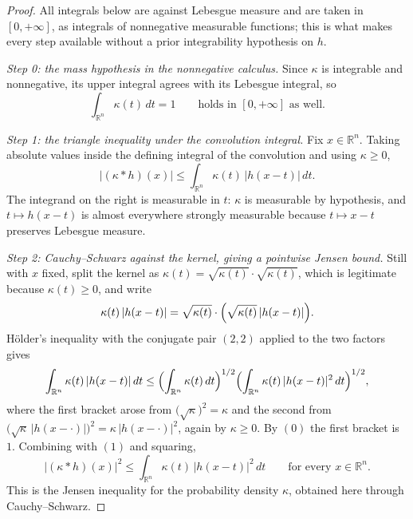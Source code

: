 \begin{proof}
All integrals below are against Lebesgue measure and are taken in $[0,+\infty]$,
as integrals of nonnegative measurable functions; this is what makes every step
available without a prior integrability hypothesis on $h$.

\emph{Step 0: the mass hypothesis in the nonnegative calculus.}  Since $\kappa$ is
integrable and nonnegative, its upper integral agrees with its Lebesgue integral,
so
\begin{equation*}
  \int_{\mathbb{R}^n} \kappa(t)\, dt = 1
  \qquad\text{holds in } [0,+\infty] \text{ as well.} \tag{0}
\end{equation*}

\emph{Step 1: the triangle inequality under the convolution integral.}
Fix $x \in \mathbb{R}^n$.  Taking absolute values inside the defining integral of
the convolution and using $\kappa \geq 0$,
\begin{equation*}
  |(\kappa*h)(x)|
    \leq \int_{\mathbb{R}^n} \kappa(t)\, |h(x-t)| \, dt . \tag{1}
\end{equation*}
The integrand on the right is measurable in $t$: $\kappa$ is measurable by
hypothesis, and $t \mapsto h(x-t)$ is almost everywhere strongly measurable
because $t \mapsto x - t$ preserves Lebesgue measure.

\emph{Step 2: Cauchy--Schwarz against the kernel, giving a pointwise Jensen bound.}
Still with $x$ fixed, split the kernel as
$\kappa(t) = \sqrt{\kappa(t)} \cdot \sqrt{\kappa(t)}$, which is legitimate because
$\kappa(t) \geq 0$, and write
\[
  \kappa(t)\,|h(x-t)|
    = \sqrt{\kappa(t)} \cdot \Bigl(\sqrt{\kappa(t)}\, |h(x-t)|\Bigr) .
\]
H\"older's inequality with the conjugate pair $(2,2)$ applied to the two factors
gives
\[
  \int_{\mathbb{R}^n} \kappa(t)\,|h(x-t)| \, dt
    \leq \Bigl(\int_{\mathbb{R}^n} \kappa(t) \, dt\Bigr)^{1/2}
        \Bigl(\int_{\mathbb{R}^n} \kappa(t)\,|h(x-t)|^2 \, dt\Bigr)^{1/2} ,
\]
where the first bracket arose from $\bigl(\sqrt{\kappa}\bigr)^2 = \kappa$ and the
second from $\bigl(\sqrt{\kappa}\,|h(x-\cdot)|\bigr)^2 = \kappa\,|h(x-\cdot)|^2$,
again by $\kappa \geq 0$.  By $(0)$ the first bracket is $1$.  Combining with
$(1)$ and squaring,
\begin{equation*}
  |(\kappa*h)(x)|^2
    \leq \int_{\mathbb{R}^n} \kappa(t)\, |h(x-t)|^2 \, dt
  \qquad \text{for every } x \in \mathbb{R}^n . \tag{2}
\end{equation*}
This is the Jensen inequality for the probability density $\kappa$, obtained here
through Cauchy--Schwarz.


\end{proof}
